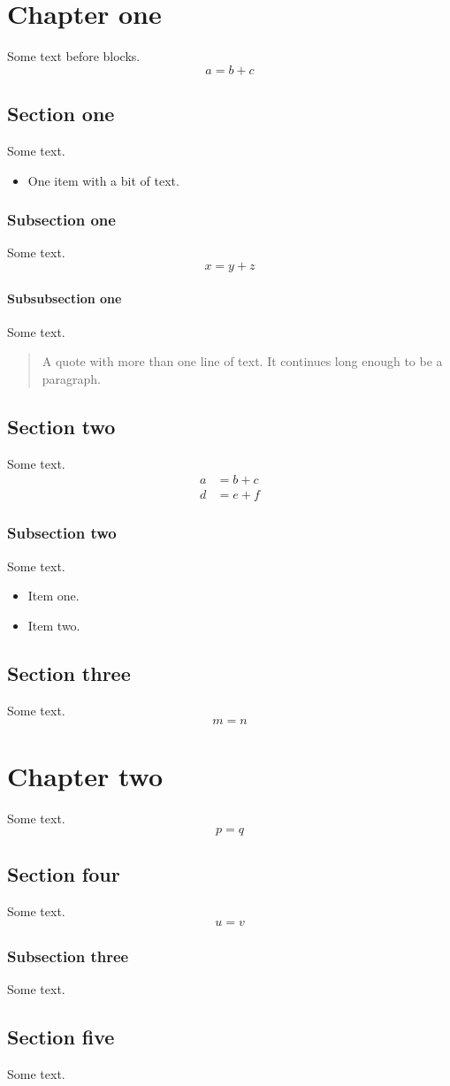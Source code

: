 \documentclass{report}
\begin{document}
\chapter{Chapter one}
Some text before blocks.
\begin{equation}a=b+c\end{equation}
\section{Section one}
Some text.
\begin{itemize}\item One item with a bit of text.\end{itemize}
\subsection{Subsection one}
Some text.
\begin{equation}x=y+z\end{equation}
\subsubsection{Subsubsection one}
Some text.
\begin{quote}A quote with more than one line of text. It continues long enough to be a paragraph.\end{quote}
\section{Section two}
Some text.
\begin{align}a&=b+c\\ d&=e+f\end{align}
\subsection{Subsection two}
Some text.
\begin{itemize}\item Item one.\item Item two.\end{itemize}
\section{Section three}
Some text.
\begin{equation}m=n\end{equation}
\chapter{Chapter two}
Some text.
\begin{equation}p=q\end{equation}
\section{Section four}
Some text.
\begin{equation}u=v\end{equation}
\subsection{Subsection three}
Some text.
\section{Section five}
Some text.
\end{document}
